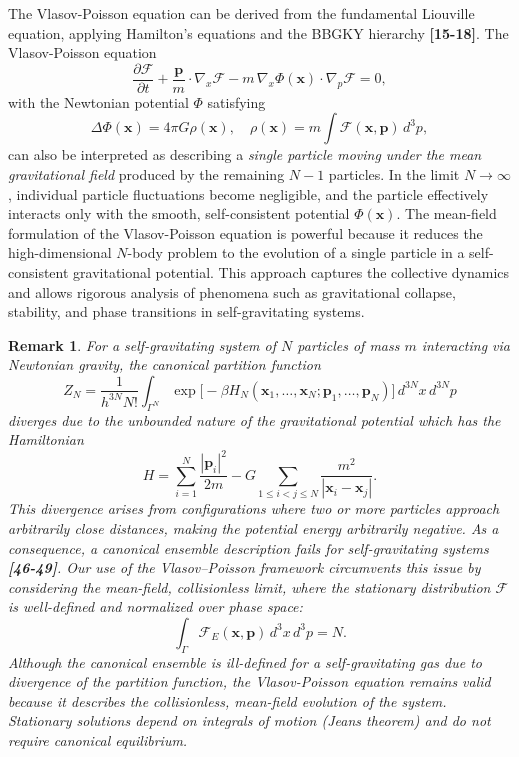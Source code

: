 \documentclass[12pt,a4paper]{article}
\newtheorem{rem}[thm]{Remark}
\numberwithin{equation}{section}
\begin{document}
The Vlasov-Poisson equation can be derived from the fundamental Liouville equation, applying Hamilton's equations and the BBGKY hierarchy \textbf{[15-18]}. The Vlasov-Poisson equation
\begin{equation}
\frac{\partial \mathcal{F}}{\partial t} + \frac{\mathbf{p}}{m} \cdot \nabla_x \mathcal{F} - m \, \nabla_x \Phi(\mathbf{x}) \cdot \nabla_p \mathcal{F} = 0,
\end{equation}
with the Newtonian potential $\Phi$ satisfying
\begin{equation}
\Delta \Phi(\mathbf{x}) = 4 \pi G \rho(\mathbf{x}), \quad \rho(\mathbf{x}) = m \int \mathcal{F}(\mathbf{x},\mathbf{p}) \, d^3p,
\end{equation}
can also be interpreted as describing a \emph{single particle moving under the mean gravitational field} produced by the remaining $N-1$ particles.
In the limit $N \to \infty$, individual particle fluctuations become negligible, and the particle effectively interacts only with the smooth, self-consistent potential $\Phi(\mathbf{x})$. The mean-field formulation of the Vlasov-Poisson equation is powerful because it reduces the high-dimensional $N$-body problem to the evolution of a single particle in a self-consistent gravitational potential. This approach captures the collective dynamics and allows rigorous analysis of phenomena such as gravitational collapse, stability, and phase transitions in self-gravitating systems.

\begin{rem}
For a self-gravitating system of $N$ particles of mass $m$ interacting via Newtonian gravity, the canonical partition function
\begin{equation}
Z_N = \frac{1}{h^{3N}N!} \int_{\Gamma^N} \exp\Big[-\beta H_N(\mathbf{x}_1,\dots,\mathbf{x}_N;\mathbf{p}_1,\dots,\mathbf{p}_N)\Big]\, d^{3N}x\, d^{3N}p
\end{equation}
diverges due to the unbounded nature of the gravitational potential which has the Hamiltonian
\begin{equation}
H = \sum_{i=1}^N \frac{|\mathbf{p}_i|^2}{2m} - G \sum_{1\le i<j\le N} \frac{m^2}{|\mathbf{x}_i - \mathbf{x}_j|}.
\end{equation}
This divergence arises from configurations where two or more particles approach arbitrarily close distances, making the potential energy arbitrarily negative.
As a consequence, a canonical ensemble description fails for self-gravitating systems \textbf{[46-49]}. Our use of the Vlasov--Poisson framework circumvents this issue by considering the \emph{mean-field, collisionless limit}, where the stationary distribution $\mathcal{F}$ is well-defined and normalized over phase space:
\begin{equation}
\int_{\Gamma} \mathcal{F}_{E}(\mathbf{x},\mathbf{p})\, d^3x\,d^3p = N.
\end{equation}
Although the canonical ensemble is ill-defined for a self-gravitating gas due to divergence of the partition function, the Vlasov-Poisson equation remains valid because it describes the collisionless, mean-field evolution of the system. Stationary solutions depend on integrals of motion (Jeans theorem) and do not require canonical equilibrium.
\end{rem}
\end{document}
